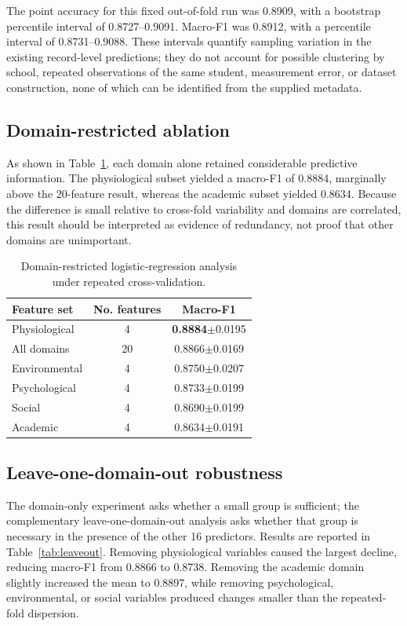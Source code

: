 \documentclass[review]{elsarticle}
\begin{document}
The point accuracy for this fixed out-of-fold run was 0.8909, with a bootstrap percentile interval of 0.8727--0.9091. Macro-F1 was 0.8912, with a percentile interval of 0.8731--0.9088. These intervals quantify sampling variation in the existing record-level predictions; they do not account for possible clustering by school, repeated observations of the same student, measurement error, or dataset construction, none of which can be identified from the supplied metadata.

\subsection{Domain-restricted ablation}
As shown in Table~\ref{tab:ablation}, each domain alone retained considerable predictive information. The physiological subset yielded a macro-F1 of 0.8884, marginally above the 20-feature result, whereas the academic subset yielded 0.8634. Because the difference is small relative to cross-fold variability and domains are correlated, this result should be interpreted as evidence of redundancy, not proof that other domains are unimportant.

\begin{table}[t]
\caption{Domain-restricted logistic-regression analysis under repeated cross-validation.}
\label{tab:ablation}
\centering
\begin{tabular}{lcc}
\toprule
Feature set & No. features & Macro-F1 \\
\midrule
Physiological & 4 & \textbf{0.8884}$\pm$0.0195 \\
All domains & 20 & 0.8866$\pm$0.0169 \\
Environmental & 4 & 0.8750$\pm$0.0207 \\
Psychological & 4 & 0.8733$\pm$0.0199 \\
Social & 4 & 0.8690$\pm$0.0199 \\
Academic & 4 & 0.8634$\pm$0.0191 \\
\bottomrule
\end{tabular}
\end{table}

\subsection{Leave-one-domain-out robustness}
The domain-only experiment asks whether a small group is sufficient; the complementary leave-one-domain-out analysis asks whether that group is necessary in the presence of the other 16 predictors. Results are reported in Table~\ref{tab:leaveout}. Removing physiological variables caused the largest decline, reducing macro-F1 from 0.8866 to 0.8738. Removing the academic domain slightly increased the mean to 0.8897, while removing psychological, environmental, or social variables produced changes smaller than the repeated-fold dispersion.
\end{document}

